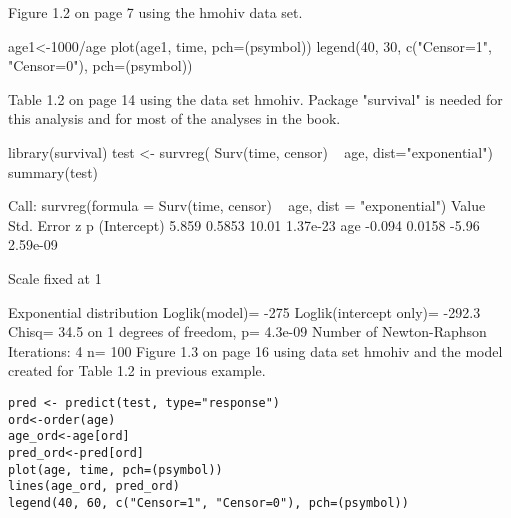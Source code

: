 \begin{frame}[fragile]
Figure 1.2 on page 7 using the hmohiv data set.

age1<-1000/age
plot(age1, time, pch=(psymbol))
legend(40, 30, c("Censor=1", "Censor=0"), pch=(psymbol))

Table 1.2 on page 14 using the data set hmohiv. Package "survival" is needed for this analysis and for most of the analyses in the book.
\end{frame}
\begin{frame}[fragile]
library(survival)
test <- survreg( Surv(time, censor) ~ age, dist="exponential")
summary(test)

Call:
survreg(formula = Surv(time, censor) ~ age, dist = "exponential")
             Value Std. Error     z        p
(Intercept)  5.859     0.5853 10.01 1.37e-23
age         -0.094     0.0158 -5.96 2.59e-09

\end{frame}
\begin{frame}[fragile]
Scale fixed at 1 

Exponential distribution
Loglik(model)= -275   Loglik(intercept only)= -292.3
        Chisq= 34.5 on 1 degrees of freedom, p= 4.3e-09 
Number of Newton-Raphson Iterations: 4 
n= 100 
Figure 1.3 on page 16 using data set hmohiv and the model created for Table 1.2 in previous example.
\end{frame}
\begin{frame}[fragile]
\begin{framed}
\begin{verbatim}
pred <- predict(test, type="response") 
ord<-order(age)
age_ord<-age[ord]
pred_ord<-pred[ord]
plot(age, time, pch=(psymbol))
lines(age_ord, pred_ord)
legend(40, 60, c("Censor=1", "Censor=0"), pch=(psymbol))
\end{verbatim}
\end{framed}
\end{frame}
